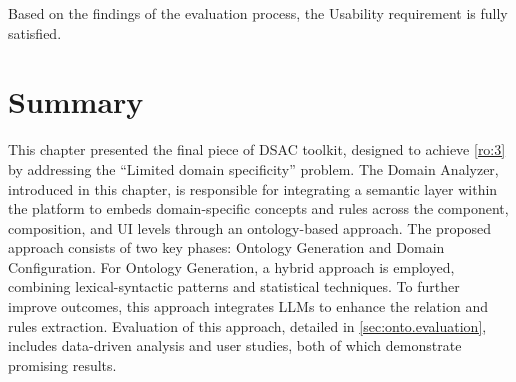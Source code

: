 Based on the findings of the evaluation process, the Usability
requirement is fully satisfied.


\vspace{-15pt}
\hypertarget{sec:onto.summary}{%
\section{Summary}\label{sec:onto.summary}}
\vspace{10pt}

This chapter presented the final piece of DSAC toolkit, designed to achieve \cref{ro:3} by addressing the “Limited domain specificity” problem. The Domain Analyzer, introduced in this chapter, is responsible for integrating a semantic layer within the platform to embeds domain-specific concepts and rules across the component, composition, and UI levels through an ontology-based approach. The proposed approach consists of two key phases: Ontology Generation and Domain Configuration. For Ontology Generation, a hybrid approach is employed, combining lexical-syntactic patterns and statistical techniques. To further improve outcomes, this approach integrates LLMs to enhance the relation and rules extraction. Evaluation of this approach, detailed in \cref{sec:onto.evaluation}, includes data-driven analysis and user studies, both of which demonstrate promising results. 